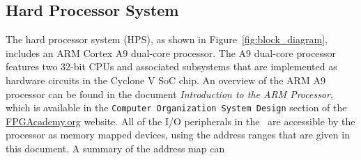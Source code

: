 \subsection{Hard Processor System}
\label{sec:hps}
The hard processor system (HPS), as shown in Figure~\ref{fig:block_diagram}, includes an 
ARM Cortex A9 dual-core processor. The A9 dual-core processor features two 32-bit CPUs 
and associated subsystems that are implemented as hardware circuits in the 
Cyclone V SoC chip.  An overview of the ARM A9 processor can be found in the 
document {\it Introduction to the ARM Processor}, which is 
available in the \texttt{Computer Organization System Design} section of the 
\href{https://www.fpgacademy.org/tutorials.html} {FPGAcademy.org} website.
All of the I/O peripherals in the \systemName~are
accessible by the processor as memory mapped devices, 
using the address ranges that are given in this document. A summary of the address map can
